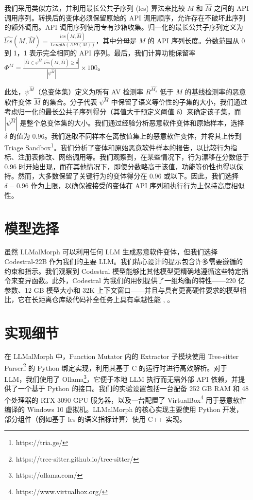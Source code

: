 我们采用类似方法，并利用最长公共子序列 (lcs) 算法来比较 $M$ 和 $\hat{M}$ 之间的 API 调用序列。转换后的变体必须保留原始的 API 调用顺序，允许存在不破坏此序列的额外调用。API 调用序列使用专有沙箱收集。归一化的最长公共子序列定义为 $\hat{lcs}(M, \hat{M})= \frac{lcs(M, \hat{M})}{Length(API(M))}$，其中分母是 $M$ 的 API 序列长度。分数范围从 0 到 1，1 表示完全相同的 API 序列。最后，我们计算功能保留率 $\Phi^{M} = \frac{|\hat{M} \in \psi^{\hat{M}}:\hat{lcs}(M,\hat{M}) \geq \delta|}{|\psi^{\hat{M}}|} \times 100$。

此处，$\psi^{\hat{M}}$（总变体集）定义为所有 AV 检测率 $R^{\hat{M_{s}}}$ 低于 $M$ 的基线检测率的恶意软件变体 $\hat{M}$ 的集合。分子代表 $\psi^{\hat{M}}$ 中保留了语义等价性的子集的大小，我们通过考虑归一化的最长公共子序列得分（其值大于预定义阈值 δ）来确定该子集，而 $|\psi^{\hat{M}}|$ 是整个总变体集的大小。我们通过经验分析恶意软件变体和原始样本，选择 $\delta$ 的值为 0.96。我们选取不同样本在离散值集上的恶意软件变体，并将其上传到 Triage Sandbox\footnote{https://tria.ge/}。我们分析了变体和原始恶意软件样本的报告，以比较行为指标、注册表修改、网络调用等。我们观察到，在某些情况下，行为漂移在分数低于 0.96 时开始出现，而在其他情况下，即使分数略高于该值，功能等价性也得以保持。然而，大多数保留了关键行为的变体得分在 0.96 或以下。因此，我们选择 $\delta = 0.96$ 作为上限，以确保被接受的变体在 API 序列和执行行为上保持高度相似性。

\section{模型选择}
虽然 LLMalMorph 可以利用任何 LLM 生成恶意软件变体，但我们选择 Codestral-22B \parencite{MAI2024} 作为我们的主要 LLM。我们精心设计的提示包含许多需要遵循的约束和指示。我们观察到 Codestral 模型能够比其他模型更精确地遵循这些特定指令来变异函数。此外，Codestral 为我们的用例提供了一组均衡的特性——220 亿参数、12 GB 模型大小和 32K 上下文窗口——并且与具有更高硬件要求的模型相比，它在长距离仓库级代码补全任务上具有卓越性能 \parencite{Dubey2024}, \parencite{Roziere2023}。

\section{实现细节}
在 LLMalMorph 中，Function Mutator 内的 Extractor 子模块使用 Tree-sitter Parser\footnote{https://tree-sitter.github.io/tree-sitter/} 的 Python 绑定实现，利用其基于 C 的运行时进行高效解析。对于 LLM，我们使用了 Ollama\footnote{https://ollama.com/}，它便于本地 LLM 执行而无需外部 API 依赖，并提供了一个基于 Python 的接口。我们的实验设置包括一台配备 252 GB RAM 和 48 个处理器的 RTX 3090 GPU 服务器，以及一台配置了 VirtualBox\footnote{https://www.virtualbox.org/} 用于恶意软件编译的 Windows 10 虚拟机。LLMalMorph 的核心实现主要使用 Python 开发，部分组件（例如基于 lcs 的语义指标计算）使用 C++ 实现。

